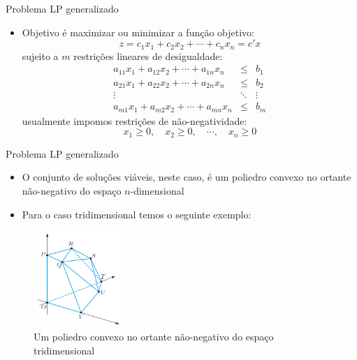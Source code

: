 \documentclass[10pt]{beamer}
\begin{document}
\begin{frame}{Problema LP generalizado}
    \begin{itemize}
        \item Objetivo é maximizar ou minimizar a função objetivo:
        \begin{equation}
            z = c_1x_1 + c_2x_2 + \cdots + c_nx_n = c'x
        \end{equation}
        sujeito a $m$ restrições lineares de desigualdade:
        \begin{eqnarray}
            a_{11}x_1 + a_{12}x_2 + \cdots + a_{1n}x_n &\leq& b_1\nonumber\\
            a_{21}x_1 + a_{22}x_2 + \cdots + a_{2n}x_n &\leq& b_2\nonumber\\
            \vdots &\ddots& \vdots\\
            a_{m1}x_1 + a_{m2}x_2 + \cdots + a_{mn}x_n &\leq& b_m\nonumber
        \end{eqnarray}
        usualmente impomos restrições de não-negatividade:
        \begin{equation}
            x_1\geq 0, \quad x_2\geq 0, \quad \cdots, \quad x_n\geq 0
        \end{equation}        
    \end{itemize}
\end{frame}

\begin{frame}{Problema LP generalizado}
    \begin{itemize}
        \item O conjunto de soluções viáveis, neste caso, é um poliedro convexo no ortante não-negativo do espaço $n$-dimensional\bigskip
        \item Para o caso tridimensional temos o seguinte exemplo:
    \end{itemize}
    \begin{figure}
        \centering
        \includegraphics[width=0.3\textwidth]{./figures/aula15_fig4.png}        
        \caption{Um poliedro convexo no ortante não-negativo do espaço tridimensional}
    \end{figure}
\end{frame}
\end{document}
